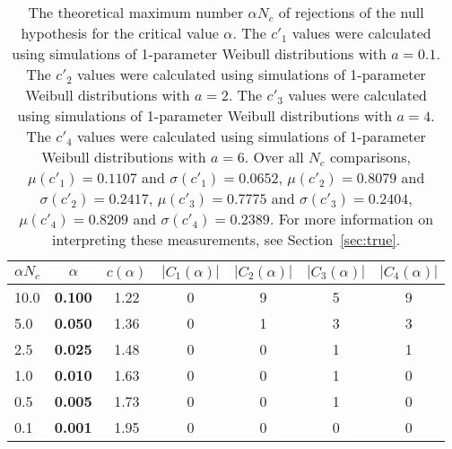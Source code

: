 \begin{table}[H]
\caption{The theoretical maximum number $\alpha N_c$ of rejections
        of the null hypothesis for the critical value $\alpha$.
        The $c'_1$ values were calculated using simulations of 1-parameter Weibull distributions with $a=0.1$.
        The $c'_2$ values were calculated using simulations of 1-parameter Weibull distributions with $a=2$.
        The $c'_3$ values were calculated using simulations of 1-parameter Weibull distributions with $a=4$.
        The $c'_4$ values were calculated using simulations of 1-parameter Weibull distributions with $a=6$.
        Over all $N_c$ comparisons,
         $\mu(c'_1)=0.1107$ and $\sigma(c'_1)=0.0652$,
         $\mu(c'_2)=0.8079$ and $\sigma(c'_2)=0.2417$,
         $\mu(c'_3)=0.7775$ and $\sigma(c'_3)=0.2404$,
         $\mu(c'_4)=0.8209$ and $\sigma(c'_4)=0.2389$.
	 For more information on interpreting these measurements, see Section~\ref{sec:true}.
	}\label{tab:true}
\begin{center}
\begin{tabular}{l | c | c || c | c | c | c}
$\alpha N_c$ & $\alpha$ & $c(\alpha)$ & $|C_1(\alpha)|$ & $|C_2(\alpha)|$ & $|C_3(\alpha)|$ & $|C_4(\alpha)|$ \\\hline
10.0 & {\bf 0.100} & 1.22 & 0 & 9 & 5 & 9 \\
5.0 & {\bf 0.050} & 1.36 & 0 & 1 & 3 & 3 \\\hline
2.5 & {\bf 0.025} & 1.48 & 0 & 0 & 1 & 1 \\
1.0 & {\bf 0.010} & 1.63 & 0 & 0 & 1 & 0 \\\hline
0.5 & {\bf 0.005} & 1.73 & 0 & 0 & 1 & 0 \\
0.1 & {\bf 0.001} & 1.95 & 0 & 0 & 0 & 0 \\
\end{tabular}
\end{center}
\end{table}
